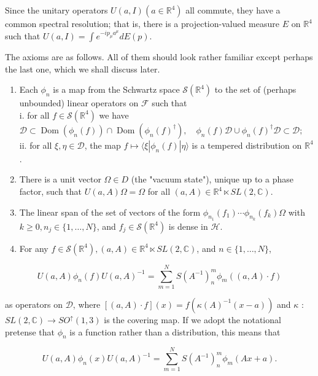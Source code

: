 \documentclass[10pt, letterpaper]{article}
\begin{document}
Since the unitary operators $U(a, I)\left(a \in \mathbb{R}^{4}\right)$ all commute, they have a common spectral resolution; that is, there is a projection-valued measure $E$ on $\mathbb{R}^{4}$ such that $U(a, I)=\int e^{-i p_{\mu} a^{\mu}} d E(p)$.

The axioms are as follows. All of them should look rather familiar except perhaps the last one, which we shall discuss later.

\begin{enumerate}
  \item Each $\phi_{n}$ is a map from the Schwartz space $\mathcal{S}\left(\mathbb{R}^{4}\right)$ to the set of (perhaps unbounded) linear operators on $\mathcal{F}$ such that\\
i. for all $f \in \mathcal{S}\left(\mathbb{R}^{4}\right)$ we have\\
$\mathcal{D} \subset \operatorname{Dom}\left(\phi_{n}(f)\right) \cap \operatorname{Dom}\left(\phi_{n}(f)^{\dagger}\right), \quad \phi_{n}(f) \mathcal{D} \cup \phi_{n}(f)^{\dagger} \mathcal{D} \subset \mathcal{D} ;$\\
ii. for all $\xi, \eta \in \mathcal{D}$, the map $f \mapsto\langle\xi| \phi_{n}(f)|\eta\rangle$ is a tempered distribution on $\mathbb{R}^{4}$.
  \item There is a unit vector $\Omega \in D$ (the "vacuum state"), unique up to a phase factor, such that $U(a, A) \Omega=\Omega$ for all $(a, A) \in \mathbb{R}^{4} \ltimes S L(2, \mathbb{C})$.
  \item The linear span of the set of vectors of the form $\phi_{n_{1}}\left(f_{1}\right) \cdots \phi_{n_{k}}\left(f_{k}\right) \Omega$ with $k \geq 0, n_{j} \in\{1, \ldots, N\}$, and $f_{j} \in \mathcal{S}\left(\mathbb{R}^{4}\right)$ is dense in $\mathcal{H}$.
  \item For any $f \in \mathcal{S}\left(\mathbb{R}^{4}\right),(a, A) \in \mathbb{R}^{4} \ltimes S L(2, \mathbb{C})$, and $n \in\{1, \ldots, N\}$,
\end{enumerate}

$$
U(a, A) \phi_{n}(f) U(a, A)^{-1}=\sum_{m=1}^{N} S\left(A^{-1}\right)_{n}^{m} \phi_{m}((a, A) \cdot f)
$$

as operators on $\mathcal{D}$, where $[(a, A) \cdot f](x)=f\left(\kappa(A)^{-1}(x-a)\right)$ and $\kappa$ : $S L(2, \mathbb{C}) \rightarrow S O^{\uparrow}(1,3)$ is the covering map. If we adopt the notational pretense that $\phi_{n}$ is a function rather than a distribution, this means that

$$
U(a, A) \phi_{n}(x) U(a, A)^{-1}=\sum_{m=1}^{N} S\left(A^{-1}\right)_{n}^{m} \phi_{m}(A x+a) .
$$
\end{document}
